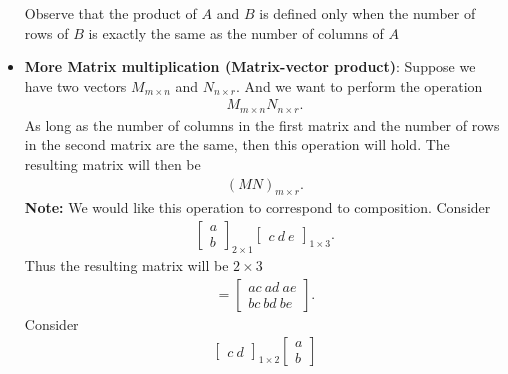 \documentclass{report}
\begin{document}
\begin{itemize}
                \bigbreak \noindent 
                Observe that the product of $A$ and $B$ is defined only when the number of rows of $B$ is exactly the same as the number of columns of $A$
            \item \textbf{More Matrix multiplication (Matrix-vector product)}: Suppose we have two vectors $M_{m\times n}$ and $N_{n\times r} $. And we want to perform the operation 
                \begin{align*}
                    M_{m\times n}N_{n\times r}
                .\end{align*}
                As long as the number of columns in the first matrix and the number of rows in the second matrix are the same, then this operation will hold. The resulting matrix will then be
                \begin{align*}
                    (MN)_{m \times r}
                .\end{align*}
                \textbf{Note:} We would like this operation to correspond to composition. 
                \bigbreak \noindent 
                Consider
                \begin{align*}
                    \begin{bmatrix}
                        a \\ b
                    \end{bmatrix}_{2\times1}
                    \begin{bmatrix}
                        c\ d\ e
                    \end{bmatrix}_{1\times 3}
                .\end{align*}
                Thus the resulting matrix will be $2\times 3$
                \begin{align*}
                    = \begin{bmatrix}
                        ac\ ad\ ae \\
                        bc\ bd\ be
                    \end{bmatrix}
                .\end{align*}
                \bigbreak \noindent 
                Consider
                \begin{align*}
                    \begin{bmatrix}
                        c \ d
                    \end{bmatrix}_{1\times 2}
                    \begin{bmatrix}
                        a \\ b

\end{bmatrix}
\end{align*}
\end{itemize}
\end{document}

